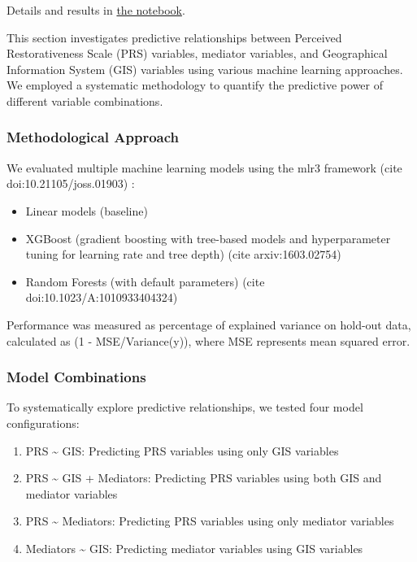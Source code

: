 \documentclass[
  letterpaper,
  DIV=11,
  numbers=noendperiod]{scrartcl}
\providecommand{\tightlist}{%
  \setlength{\itemsep}{0pt}\setlength{\parskip}{0pt}}
\begin{document}
Details and results in \href{notebooks/mlr3.qmd}{the notebook}.

This section investigates predictive relationships between Perceived
Restorativeness Scale (PRS) variables, mediator variables, and
Geographical Information System (GIS) variables using various machine
learning approaches. We employed a systematic methodology to quantify
the predictive power of different variable combinations.

\subsubsection{Methodological Approach}\label{methodological-approach}

We evaluated multiple machine learning models using the mlr3 framework
(cite doi:10.21105/joss.01903) :

\begin{itemize}
\tightlist
\item
  Linear models (baseline)
\item
  XGBoost (gradient boosting with tree-based models and hyperparameter
  tuning for learning rate and tree depth) (cite arxiv:1603.02754)
\item
  Random Forests (with default parameters) (cite
  doi:10.1023/A:1010933404324)
\end{itemize}

Performance was measured as percentage of explained variance on hold-out
data, calculated as (1 - MSE/Variance(y)), where MSE represents mean
squared error.

\subsubsection{Model Combinations}\label{model-combinations}

To systematically explore predictive relationships, we tested four model
configurations:

\begin{enumerate}
\def\labelenumi{\arabic{enumi}.}
\tightlist
\item
  PRS \textasciitilde{} GIS: Predicting PRS variables using only GIS
  variables
\item
  PRS \textasciitilde{} GIS + Mediators: Predicting PRS variables using
  both GIS and mediator variables
\item
  PRS \textasciitilde{} Mediators: Predicting PRS variables using only
  mediator variables
\item
  Mediators \textasciitilde{} GIS: Predicting mediator variables using
  GIS variables
\end{enumerate}
\end{document}
